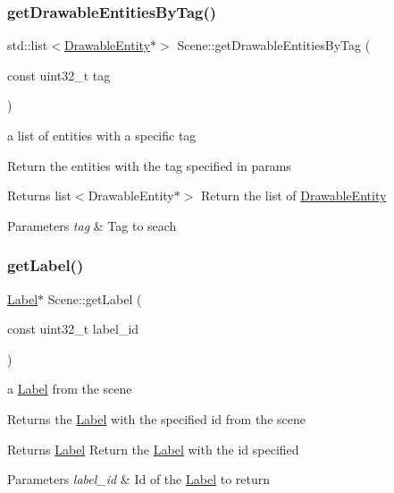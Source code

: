 \subsubsection{\texorpdfstring{get\+Drawable\+Entities\+By\+Tag()}{getDrawableEntitiesByTag()}}
{\footnotesize\ttfamily std\+::list$<$\hyperlink{class_drawable_entity}{Drawable\+Entity}$\ast$$>$ Scene\+::get\+Drawable\+Entities\+By\+Tag (\begin{DoxyParamCaption}\item[{const uint32\+\_\+t}]{tag }\end{DoxyParamCaption})}

a list of entities with a specific tag

Return the entities with the tag specified in params

\begin{DoxyReturn}{Returns}
list$<$\+Drawable\+Entity$\ast$$>$ Return the list of \hyperlink{class_drawable_entity}{Drawable\+Entity} 
\end{DoxyReturn}

\begin{DoxyParams}{Parameters}
{\em tag} & Tag to seach \\
\hline
\end{DoxyParams}
\mbox{\label{class_scene_aa65487dbbc075503ccf386df47b5cbc8}} 
\subsubsection{\texorpdfstring{get\+Label()}{getLabel()}}
{\footnotesize\ttfamily \hyperlink{class_label}{Label}$\ast$ Scene\+::get\+Label (\begin{DoxyParamCaption}\item[{const uint32\+\_\+t}]{label\+\_\+id }\end{DoxyParamCaption})}

a \hyperlink{class_label}{Label} from the scene

Returns the \hyperlink{class_label}{Label} with the specified id from the scene

\begin{DoxyReturn}{Returns}
\hyperlink{class_label}{Label} Return the \hyperlink{class_label}{Label} with the id specified 
\end{DoxyReturn}

\begin{DoxyParams}{Parameters}
{\em label\+\_\+id} & Id of the \hyperlink{class_label}{Label} to return \\
\hline
\end{DoxyParams}
\mbox{\label{class_scene_abff9132084e8edf5eee4f992233dc2e3}} 
